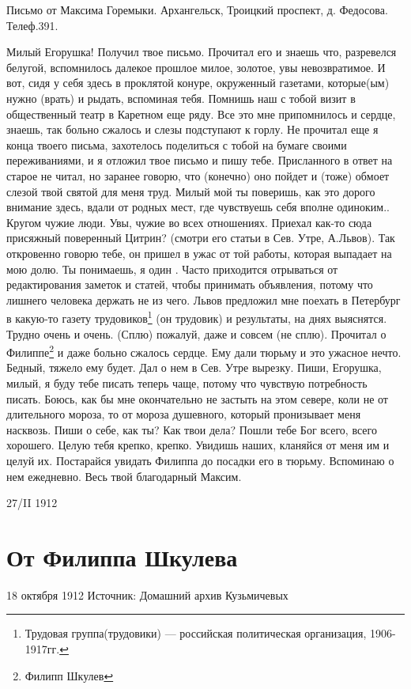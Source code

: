 \documentclass[]{memoir}
\begin{document}
Письмо от Максима Горемыки.
Архангельск,
Троицкий проспект, д. Федосова.
Телеф.391.

Милый Егорушка!
Получил твое письмо. Прочитал его и знаешь что, разревелся белугой, вспомнилось далекое прошлое милое, золотое, увы невозвратимое. И вот, сидя у себя здесь в проклятой конуре, окруженный газетами, которые(ым) нужно (врать)  и рыдать, вспоминая тебя. Помнишь наш с тобой визит в общественный театр в Каретном еще ряду. Все это мне припомнилось и сердце, знаешь, так больно сжалось и слезы подступают к горлу. Не прочитал еще я конца твоего письма, захотелось поделиться с тобой на бумаге своими переживаниями, и я отложил твое письмо и пишу тебе.  Присланного в ответ на старое не читал, но заранее говорю, что (конечно) оно пойдет и (тоже) обмоет слезой твой святой для меня труд. Милый мой  ты поверишь, как это дорого внимание здесь, вдали от родных мест, где чувствуешь себя вполне одиноким.. Кругом чужие люди. Увы, чужие во всех отношениях. Приехал как-то сюда присяжный поверенный Цитрин? (смотри его статьи в Сев. Утре, А.Львов). Так откровенно говорю тебе, он пришел в ужас от той работы, которая  выпадает на мою долю.  Ты понимаешь, я один . Часто приходится отрываться от редактирования заметок и статей, чтобы принимать объявления, потому что лишнего человека держать не из чего. Львов предложил мне поехать в Петербург в какую-то  газету трудовиков\footnote{Трудовая группа(трудовики) — российская политическая организация, 1906-1917гг.} (он трудовик) и результаты, на днях выяснятся. Трудно очень и очень. (Сплю)  пожалуй, даже и совсем (не сплю). Прочитал о Филиппе\footnote{Филипп Шкулев} и даже больно сжалось сердце. Ему дали тюрьму и это ужасное нечто. Бедный, тяжело ему будет. Дал о нем в Сев. Утре вырезку. Пиши, Егорушка, милый, я буду тебе писать теперь чаще, потому что чувствую  потребность писать. Боюсь, как бы мне окончательно не застыть на этом севере, коли не от длительного мороза, то от мороза душевного, который пронизывает меня насквозь.
Пиши о себе, как ты? Как твои дела? Пошли тебе Бог всего, всего хорошего. Целую тебя крепко, крепко. Увидишь наших, кланяйся от меня им и целуй их. Постарайся  увидать Филиппа до посадки его  в тюрьму. Вспоминаю о нем ежедневно. Весь твой благодарный 
                                              Максим.

27/II 1912

\section{От Филиппа Шкулева}
18 октября 1912
Источник: Домашний архив Кузьмичевых
\end{document}
